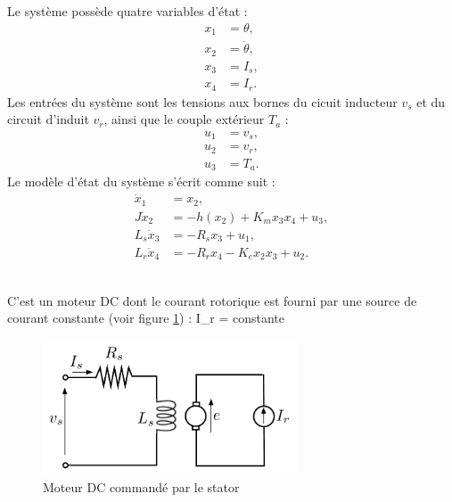 Le système possède quatre variables d'état :
\begin{equation*} \begin{split}
x_1 &= \theta, \\
x_2 &= \dot{\theta}, \\
x_3 &= I_s, \\
x_4 &= I_r.
\end{split} \end{equation*}
Les entrées du système sont les tensions aux bornes du cicuit inducteur
$v_s$ et du circuit d'induit $v_r$, ainsi que le couple extérieur $T_a$ :
\begin{equation*} \begin{split}
u_1 &= v_s, \\
u_2 &= v_r, \\
u_3 &= T_a.
\end{split} \end{equation*}
Le modèle d'état du système s'écrit comme suit :
\begin{equation*} \begin{split}
\dot x_1 &= x_2,\\
J\dot x_2 &= -h(x_2) + K_m x_3x_4 + u_3,\\
L_s\dot x_3 &= -R_s x_3 + u_1,\\
L_r\dot x_4 &= -R_r x_4 - K_ex_2x_3 + u_2.
\end{split} \end{equation*}
\\

C'est un moteur DC dont le courant rotorique est fourni par une source de
courant constante (voir figure \ref{fig:cominducteur}) :
\eqnn
I_r = constante
\eeqnn
\begin{figure}[htbp]
\begin{center}
\includegraphics[height=4cm]{cominducteur}
\caption{Moteur DC commandé par le stator}
\label{fig:cominducteur}
\end{center}
\end{figure}

